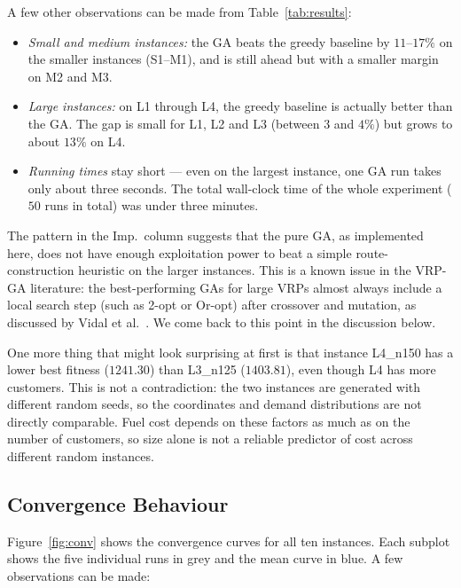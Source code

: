 \documentclass [a4paper, 11pt, titlepage] {article}
\begin{document}
A few other observations can be made from Table~\ref{tab:results}:

\begin{itemize}
    \item \emph{Small and medium instances:} the GA beats the greedy baseline by $11$--$17\%$ on the smaller instances (S1--M1), and is still ahead but with a smaller margin on M2 and M3.
    \item \emph{Large instances:} on L1 through L4, the greedy baseline is actually better than the GA. The gap is small for L1, L2 and L3 (between $3$ and $4\%$) but grows to about $13\%$ on L4.
    \item \emph{Running times} stay short --- even on the largest instance, one GA run takes only about three seconds. The total wall-clock time of the whole experiment ($50$ runs in total) was under three minutes.
\end{itemize}

The pattern in the Imp.\ column suggests that the pure GA, as implemented here, does not have enough exploitation power to beat a simple route-construction heuristic on the larger instances. This is a known issue in the VRP-GA literature: the best-performing GAs for large VRPs almost always include a local search step (such as 2-opt or Or-opt) after crossover and mutation, as discussed by Vidal et al.\ \cite{vidal2020}. We come back to this point in the discussion below.

One more thing that might look surprising at first is that instance L4\_n150 has a lower best fitness ($1241.30$) than L3\_n125 ($1403.81$), even though L4 has more customers. This is not a contradiction: the two instances are generated with different random seeds, so the coordinates and demand distributions are not directly comparable. Fuel cost depends on these factors as much as on the number of customers, so size alone is not a reliable predictor of cost across different random instances.

\subsection{Convergence Behaviour}
\label{sec:convergence}

Figure~\ref{fig:conv} shows the convergence curves for all ten instances. Each subplot shows the five individual runs in grey and the mean curve in blue. A few observations can be made:
\end{document}
